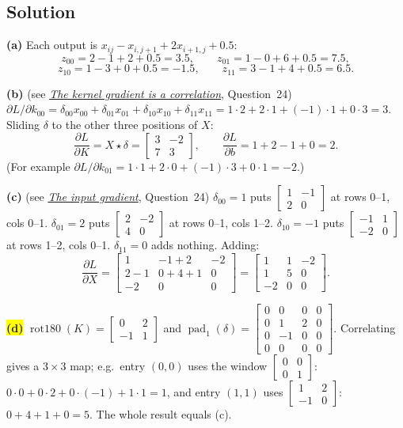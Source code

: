 \documentclass[12pt,a4paper]{article}
\newcommand{\seeconcept}[3]{(see \hyperref[#1]{\textit{#2}}, Question~#3)}
\newcommand{\rot}{\operatorname{rot180}}
\newcommand{\hlq}[1]{{\setlength{\fboxsep}{1.5pt}\colorbox{yellow}{#1}}}
\begin{document}
\subsection*{Solution}
\textbf{(a)} Each output is $x_{ij}-x_{i,j+1}+2x_{i+1,j}+0.5$:
\[
z_{00}=2-1+2+0.5=3.5,\qquad z_{01}=1-0+6+0.5=7.5,
\]
\[
z_{10}=1-3+0+0.5=-1.5,\qquad z_{11}=3-1+4+0.5=6.5 .
\]

\textbf{(b)} \seeconcept{c:convgradK}{The kernel gradient is a correlation}{24}
$\partial L/\partial k_{00}=\delta_{00}x_{00}+\delta_{01}x_{01}+\delta_{10}x_{10}+\delta_{11}x_{11}=1\cdot2+2\cdot1+(-1)\cdot1+0\cdot3=3$. Sliding $\delta$ to the other three positions of $X$:
\[
\frac{\partial L}{\partial K}=X\star\delta=\begin{bmatrix}3&-2\\7&3\end{bmatrix},\qquad \frac{\partial L}{\partial b}=1+2-1+0=2 .
\]
(For example $\partial L/\partial k_{01}=1\cdot1+2\cdot0+(-1)\cdot3+0\cdot1=-2$.)

\textbf{(c)} \seeconcept{c:convgradX}{The input gradient}{24}
$\delta_{00}=1$ puts $\begin{bmatrix}1&-1\\2&0\end{bmatrix}$ at rows 0--1, cols 0--1. $\delta_{01}=2$ puts $\begin{bmatrix}2&-2\\4&0\end{bmatrix}$ at rows 0--1, cols 1--2. $\delta_{10}=-1$ puts $\begin{bmatrix}-1&1\\-2&0\end{bmatrix}$ at rows 1--2, cols 0--1. $\delta_{11}=0$ adds nothing. Adding:
\[
\frac{\partial L}{\partial X}=\begin{bmatrix}1&-1+2&-2\\2-1&0+4+1&0\\-2&0&0\end{bmatrix}=\begin{bmatrix}1&1&-2\\1&5&0\\-2&0&0\end{bmatrix}.
\]

\hlq{\textbf{(d)}} $\rot(K)=\begin{bmatrix}0&2\\-1&1\end{bmatrix}$ and $\operatorname{pad}_1(\delta)=\begin{bmatrix}0&0&0&0\\0&1&2&0\\0&-1&0&0\\0&0&0&0\end{bmatrix}$. Correlating gives a $3\times3$ map; e.g.\ entry $(0,0)$ uses the window $\begin{bmatrix}0&0\\0&1\end{bmatrix}$: $0\cdot0+0\cdot2+0\cdot(-1)+1\cdot1=1$, and entry $(1,1)$ uses $\begin{bmatrix}1&2\\-1&0\end{bmatrix}$: $0+4+1+0=5$. The whole result equals (c).
\end{document}
